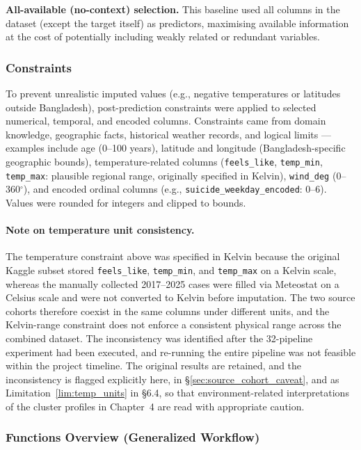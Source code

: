 \textbf{All-available (no-context) selection.} This baseline used all columns in the dataset (except the target itself) as predictors, maximising available information at the cost of potentially including weakly related or redundant variables.

\subsubsection{Constraints}

To prevent unrealistic imputed values (e.g., negative temperatures or latitudes outside Bangladesh), post-prediction constraints were applied to selected numerical, temporal, and encoded columns. Constraints came from domain knowledge, geographic facts, historical weather records, and logical limits --- examples include age (0--100 years), latitude and longitude (Bangladesh-specific geographic bounds), temperature-related columns (\texttt{feels\_like}, \texttt{temp\_min}, \texttt{temp\_max}: plausible regional range, originally specified in Kelvin), \texttt{wind\_deg} (0--360$^{\circ}$), and encoded ordinal columns (e.g., \texttt{suicide\_weekday\_encoded}: 0--6). Values were rounded for integers and clipped to bounds.

\paragraph{Note on temperature unit consistency.} The temperature constraint above was specified in Kelvin because the original Kaggle subset stored \texttt{feels\_like}, \texttt{temp\_min}, and \texttt{temp\_max} on a Kelvin scale, whereas the manually collected 2017--2025 cases were filled via Meteostat on a Celsius scale and were not converted to Kelvin before imputation. The two source cohorts therefore coexist in the same columns under different units, and the Kelvin-range constraint does not enforce a consistent physical range across the combined dataset. The inconsistency was identified after the 32-pipeline experiment had been executed, and re-running the entire pipeline was not feasible within the project timeline. The original results are retained, and the inconsistency is flagged explicitly here, in \S\ref{sec:source_cohort_caveat}, and as Limitation~\ref{lim:temp_units} in \S6.4, so that environment-related interpretations of the cluster profiles in Chapter~4 are read with appropriate caution.

\subsubsection{Functions Overview (Generalized Workflow)}


